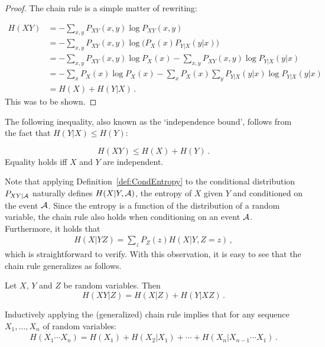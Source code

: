 \begin{proof}
The chain rule is a simple matter of rewriting:

\begin{align}
H(XY) &= -\sum_{x,y} P_{XY}(x,y)\log P_{XY}(x,y) \nonumber \\
&= -\sum_{x,y} P_{XY}(x,y)\log\bigl(P_X(x)P_{Y|X}(y|x)\bigr) \nonumber \\
&= -\sum_{x,y} P_{XY}(x,y) \log P_X(x)  -\sum_{x,y}
P_{XY}(x,y) \log P_{Y|X}(y|x) \nonumber \\
&=  -\sum_{x}P_X(x)\log P_X(x) - \sum_{x} P_X(x)\sum_{y} P_{Y|X}(y|x) \log
P_{Y|X}(y|x) \nonumber \\
&= H(X) + H(Y|X) \, .
\end{align}
This was to be shown. 
\end{proof}
The following inequality, also known as the `independence bound', follows from the fact that $H(Y|X)\leq H(Y)$:
\begin{corollary}[Subadditivity]
\[
H(XY)\leq H(X)+H(Y) \, .
\]
Equality holds iff $X$ and $Y$ are independent.
\end{corollary}

Note that applying Definition~\ref{def:CondEntropy} to the conditional distribution $P_{XY|\cal A}$ naturally defines $H(X|Y,{\cal A})$, the entropy of $X$ given $Y$ and conditioned on the event $\cal A$. 
Since the entropy is a function of the distribution of a random variable, the chain rule also holds when conditioning on an event ${\cal A}$. Furthermore, it holds that
\begin{align}
H(X|YZ) = \sum_z P_Z(z) H(X|Y,Z\!=\!z) \, ,
\end{align}
which is straightforward to verify. With this observation, it is easy to see that the chain rule generalizes as follows. 

\begin{corollary}
Let $X$, $Y$ and $Z$ be random variables. Then
\[
H(XY|Z) = H(X|Z) + H(Y|XZ) \, .
\]
\end{corollary}%
Inductively applying the (generalized) chain rule implies that for any sequence $X_1,\ldots,X_n$ of random variables: 
\begin{align}
H(X_1\cdots X_n)= H(X_1) + H(X_2|X_1) + \cdots + H(X_n|X_{n-1}\cdots
X_1) \, .
\end{align}

